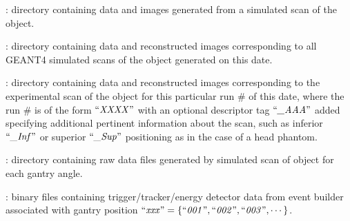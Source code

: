 \documentclass[landscape,12pt]{article}
\begin{document}
\begin{myEnumerate}[labelindent=1pt, leftmargin=*]
\begin{myEnumerate}[labelindent=1pt, leftmargin=*]
\begin{myEnumerate}[labelindent=1pt, leftmargin=*]
\begin{myEnumerate}[labelindent=1pt, leftmargin=*]
\begin{myEnumerate}[labelindent=1pt, leftmargin=*]
\begin{myEnumerate}[labelindent=1pt, leftmargin=*]
\begin{myEnumerate}[labelindent=1pt, leftmargin=*]
\begin{myEnumerate}[labelindent=1pt, leftmargin=*]
                                \end{myEnumerate}
                            \end{myEnumerate}
                        \end{myEnumerate}
                    \end{myEnumerate}
                \end{myEnumerate}
            \end{myEnumerate}
            \item {} \color{Black}: directory containing data and images generated from a simulated scan of the object.
            \begin{myEnumerate}[labelindent=1pt, leftmargin=*]
                \item {} \color{Black}: directory containing data and reconstructed images corresponding to all GEANT4 simulated scans of the object generated on this date.
                \begin{myEnumerate}[labelindent=1pt, leftmargin=*]
                    \item {} \color{Black}: directory containing data and reconstructed images corresponding to the experimental scan of the object for this particular run \# of this date, where the run \# is of the form $\textrm{``\textit{XXXX}''}$ with an optional descriptor tag $\textrm{``\textit{\_AAA}''}$ added specifying additional pertinent information about the scan, such as inferior $\textrm{``\textit{\_Inf}''}$ or superior $\textrm{``\textit{\_Sup}''}$ positioning as in the case of a head phantom.
                    \begin{myEnumerate}[labelindent=1pt, leftmargin=*]
                        \item {} \color{Black}: directory containing raw data files generated by simulated scan of object for each gantry angle.
                        \begin{myEnumerate}[labelindent=1pt, leftmargin=*]
                            \item {} \color{Black}: binary files containing trigger/tracker/energy detector data from event builder associated with gantry position $\textrm{``\textit{xxx}''} =\{\textrm{``\textit{001}''}, \textrm{``\textit{002}''}, \textrm{``\textit{003}''}, \cdots\}$.
                        \end{myEnumerate}

\end{myEnumerate}
\end{myEnumerate}
\end{myEnumerate}
\end{myEnumerate}
\end{myEnumerate}
\end{document}

